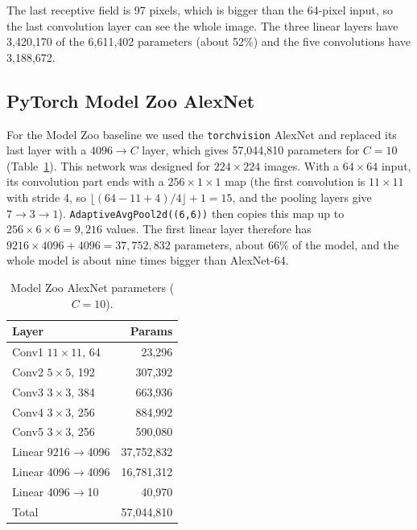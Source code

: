 \documentclass[12pt]{article}
\begin{document}
The last receptive field is 97 pixels, which is bigger than the 64-pixel input, so the last convolution layer can
see the whole image. The three linear layers have 3{,}420{,}170 of the 6{,}611{,}402 parameters (about 52\%) and the
five convolutions have 3{,}188{,}672.

\subsection{PyTorch Model Zoo AlexNet}

For the Model Zoo baseline we used the \texttt{torchvision} AlexNet and replaced its last layer with a
$4096\to C$ layer, which gives 57{,}044{,}810 parameters for $C{=}10$ (Table~\ref{tab:zoo}). This network was designed
for $224{\times}224$ images. With a $64{\times}64$ input, its convolution part ends with a $256{\times}1{\times}1$ map
(the first convolution is $11{\times}11$ with stride 4, so $\lfloor(64-11+4)/4\rfloor+1=15$, and the pooling layers
give $7\to3\to1$). \texttt{AdaptiveAvgPool2d((6,6))} then copies this map up to $256{\times}6{\times}6 = 9{,}216$
values. The first linear layer therefore has $9216\times4096+4096 = 37{,}752{,}832$ parameters, about 66\% of the model,
and the whole model is about nine times bigger than AlexNet-64.

\begin{table}[H]
\centering
\caption{Model Zoo AlexNet parameters ($C{=}10$).}
\label{tab:zoo}
\begin{tabular}{lr}
\toprule
Layer & Params \\
\midrule
Conv1 $11{\times}11$, 64          & 23{,}296 \\
Conv2 $5{\times}5$, 192           & 307{,}392 \\
Conv3 $3{\times}3$, 384           & 663{,}936 \\
Conv4 $3{\times}3$, 256           & 884{,}992 \\
Conv5 $3{\times}3$, 256           & 590{,}080 \\
Linear 9216$\to$4096              & 37{,}752{,}832 \\
Linear 4096$\to$4096              & 16{,}781{,}312 \\
Linear 4096$\to$10                & 40{,}970 \\
\midrule
Total                             & 57{,}044{,}810 \\
\bottomrule
\end{tabular}
\end{table}
\end{document}
